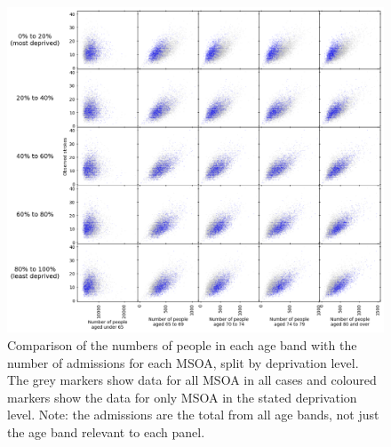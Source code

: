 \documentclass[12pt]{extarticle}
\begin{document}
\begin{figure}
    \centering
    \includegraphics[width=1.0\linewidth]{images/scatter_age_admissions_by_imd.png}
    \caption{
    Comparison of the numbers of people in each age band with the number of admissions for each MSOA, split by deprivation level. The grey markers show data for all MSOA in all cases and coloured markers show the data for only MSOA in the stated deprivation level.
    Note: the admissions are the total from all age bands, not just the age band relevant to each panel.
    }
    \label{fig:scatter_age_admissions_by_imd}
\end{figure}

\end{document}
